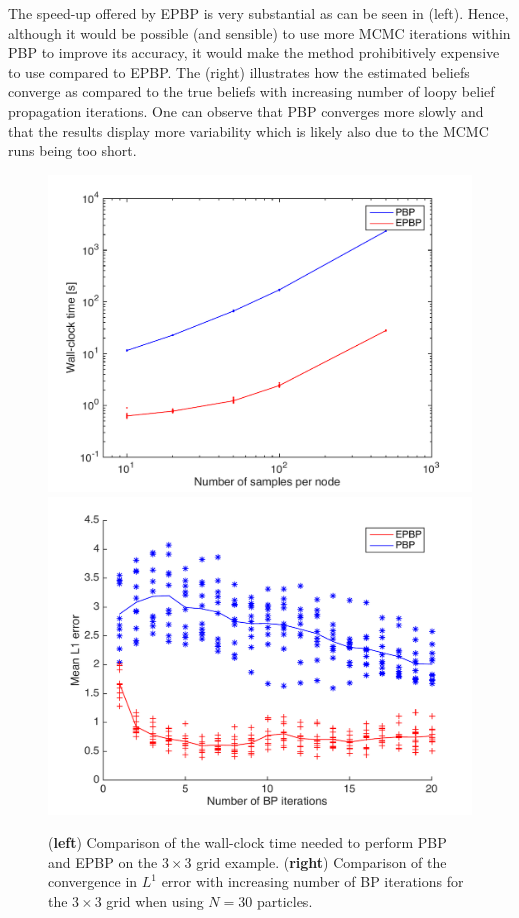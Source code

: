 The speed-up offered by EPBP is very substantial as can be seen in  (left). Hence, although it would be possible (and sensible) to use more MCMC iterations within PBP to improve its accuracy, it would make the method prohibitively expensive to use compared to EPBP. The  (right) illustrates how the estimated beliefs converge as compared to the true beliefs with increasing number of loopy belief propagation iterations. One can observe that PBP converges more slowly and that the results display more variability which is likely also due to the MCMC runs being too short. %

%
%
%
%
%

%
\begin{figure}[!h]
\center
\includegraphics[width=.51\textwidth]{figures/epbp/timeComparison}
\hspace*{-.7cm}
\includegraphics[width=.51\textwidth]{figures/epbp/compBPconv}
%
\caption{\label{compConv} (\textbf{left}) Comparison of the wall-clock time needed to perform PBP and EPBP on the $3\times 3$ grid example. (\textbf{right}) Comparison of the convergence in $L^{1}$ error with increasing number of BP iterations for the $3\times 3$ grid when using $N=30$ particles. }%
\end{figure}

